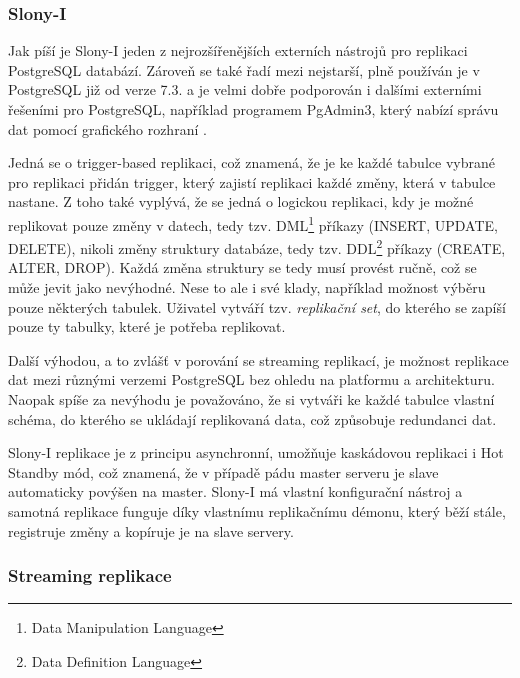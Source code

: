       \subsubsection{Slony-I}
      \label{kSlony}

      Jak píší \cite{Boszormenyi2013} je Slony-I jeden z nejrozšířenějších externích nástrojů pro replikaci PostgreSQL databází. Zároveň se také řadí mezi nejstarší, plně používán je v PostgreSQL již od verze 7.3. a je velmi dobře podporován i dalšími externími řešeními pro PostgreSQL, například programem PgAdmin3, který nabízí správu dat pomocí grafického rozhraní \citep{Boszormenyi2013}.

      Jedná se o trigger-based replikaci, což znamená, že je ke každé tabulce vybrané pro replikaci přidán trigger, který zajistí replikaci každé změny, která v tabulce nastane. Z toho také vyplývá, že se jedná o logickou replikaci, kdy je možné replikovat pouze změny v datech, tedy tzv. DML\footnote{Data Manipulation Language} příkazy (INSERT, UPDATE, DELETE), nikoli změny struktury databáze, tedy tzv. DDL\footnote{Data Definition Language} příkazy (CREATE, ALTER, DROP). Každá změna struktury se tedy musí provést ručně, což se může jevit jako nevýhodné. Nese to ale i své klady, například možnost výběru pouze některých tabulek. Uživatel vytváří tzv. {\it replikační set}, do kterého se zapíší pouze ty tabulky, které je potřeba replikovat. 

Další výhodou, a to zvlášť v porování se streaming replikací, je možnost replikace dat mezi různými verzemi PostgreSQL bez ohledu na platformu a architekturu. Naopak spíše za nevýhodu je považováno, že si vytváři ke každé tabulce vlastní schéma, do kterého se ukládají replikovaná data, což způsobuje redundanci dat. 

Slony-I replikace je z principu asynchronní, umožňuje kaskádovou replikaci i Hot Standby mód, což znamená, že v případě pádu master serveru je slave automaticky povýšen na master. Slony-I má vlastní konfigurační nástroj a samotná replikace funguje díky vlastnímu replikačnímu démonu, který běží stále, registruje změny a kopíruje je na slave servery.

      \subsubsection{Streaming replikace}
      \label{kStreamingTeorie}

